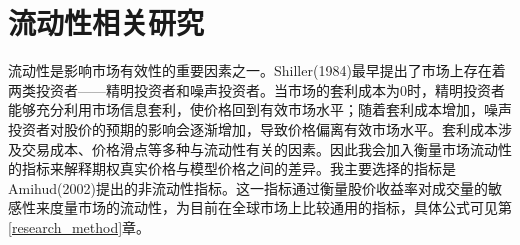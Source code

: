 \section{流动性相关研究}
\par{流动性是影响市场有效性的重要因素之一。Shiller(1984)最早提出了市场上存在着两类投资者——精明投资者和噪声投资者\cite{Rober-1984}。当市场的套利成本为0时，精明投资者能够充分利用市场信息套利，使价格回到有效市场水平；随着套利成本增加，噪声投资者对股价的预期的影响会逐渐增加，导致价格偏离有效市场水平。套利成本涉及交易成本、价格滑点等多种与流动性有关的因素。因此我会加入衡量市场流动性的指标来解释期权真实价格与模型价格之间的差异。我主要选择的指标是Amihud(2002)提出的非流动性指标\cite{Yako-2002}。这一指标通过衡量股价收益率对成交量的敏感性来度量市场的流动性，为目前在全球市场上比较通用的指标，具体公式可见第\ref{research_method}章。}
